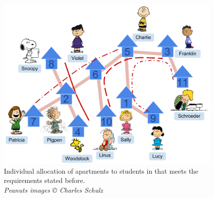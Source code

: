 \begin{figure}[htbp]
  \includegraphics[scale=0.5]{../img/3_infinite_loop.pdf}
  \caption[\figtabsize Solution to the student accommodation
  problem.]{\figtabsize Individual allocation of apartments to
    students in {\residenceblock} that meets the requirements stated
    before.  %
    \\ {\tiny {\em Peanuts images
        {\copyright} Charles Schulz}}}%
  \label{fig:streetmappathpeople}
\end{figure}

